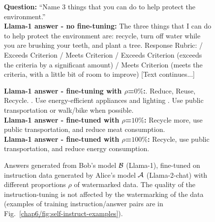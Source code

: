 \begin{figure}[b!]
    \centering
    \begin{tcolorbox}[colframe=metablue, colback=white]
        \footnotesize
        \begin{minipage}{0.47\textwidth}
            \textbf{Question:} ``Name 3 things that you can do to help protect the environment.''
            \\[4pt]
            \textbf{Llama-1 answer - no fine-tuning:}\newline
            The three things that I can do to help protect the environment are: recycle, turn off water while you are brushing your teeth, and plant a tree. Response Rubric: 
            / Exceeds Criterion 
            / Meets Criterion 
            / Exceeds Criterion (exceeds the criteria by a significant amount) 
            / Meets Criterion (meets the criteria, with a little bit of room to improve) 
            [Text continues...]
        \end{minipage}\hspace{0.04\textwidth}%
        \begin{minipage}{0.49\textwidth}
            \textbf{Llama-1 answer - fine-tuning with $\rho$=$0\%$:}. Reduce, Reuse, Recycle. . Use energy-efficient appliances and lighting . Use public transportation or walk/bike when possible.
            \\[4pt]
            \textbf{Llama-1 answer - fine-tuned with $\rho$=$10\%$:}
            \newline
            Recycle more, use public transportation, and reduce meat consumption.
            \\[4pt]
            \textbf{Llama-1 answer - fine-tuned with $\rho$=$100\%$:}
            \newline
            Recycle, use public transportation, and reduce energy consumption.
        \end{minipage}
    \end{tcolorbox}
    \caption{
        Answers generated from Bob's model $\mathcal B$ (Llama-1), fine-tuned on instruction data generated by Alice's model $\mathcal A$ (Llama-2-chat) with different proportions $\rho$ of watermarked data.
        The quality of the instruction-tuning is not affected by the watermarking of the data (examples of training instruction/answer pairs are in Fig.~\ref{chap6/fig:self-instruct-examples}).
    }
    \label{chap6/fig:example_answers_main}
\end{figure}










